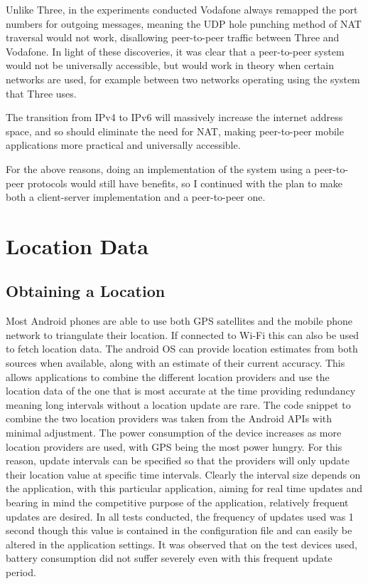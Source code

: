 Unlike Three, in the experiments conducted Vodafone always remapped the port numbers for outgoing messages, meaning the UDP hole punching method of NAT traversal would not work, disallowing peer-to-peer traffic between Three and Vodafone.
In light of these discoveries, it was clear that a peer-to-peer system would not be universally accessible, but would work in theory when certain networks are used, for example between two networks operating using the system that Three uses.

The transition from IPv4 to IPv6 will massively increase the internet address space\cite{ipv6}, and so should eliminate the need for NAT, making peer-to-peer mobile applications more practical and universally accessible.

For the above reasons, doing an implementation of the system using a peer-to-peer protocols would still have benefits, so I continued with the plan to make both a client-server implementation and a peer-to-peer one.

\section{Location Data}
\label{location}
\subsection{Obtaining a Location}

Most Android phones are able to use both GPS satellites and the mobile phone network to triangulate their location. If connected to Wi-Fi this can also be used to fetch location data.
The android OS can provide location estimates from both sources when available, along with an estimate of their current accuracy. This allows applications to combine the different location providers and use the location data of the one that is most accurate at the time providing redundancy meaning long intervals without a location update are rare. The code snippet to combine the two location providers was taken from the Android APIs with minimal adjustment. The power consumption of the device increases as more location providers are used, with GPS being the most power hungry. For this reason, update intervals can be specified so that the providers will only update their location value at specific time intervals. Clearly the interval size depends on the application, with this particular application, aiming for real time updates and bearing in mind the competitive purpose of the application, relatively frequent updates are desired.\cite{androidAPI}
In all tests conducted, the frequency of updates used was 1 second though this value is contained in the configuration file and can easily be altered in the application settings. It was observed that on the test devices used, battery consumption did not suffer severely even with this frequent update period.

